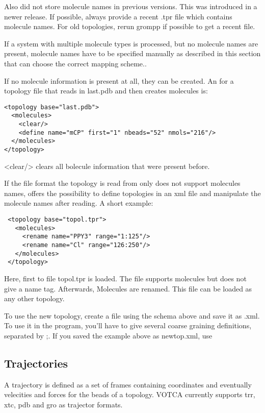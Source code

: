 Also \gromacs did not store molecule names in previous versions. This was introduced in a newer release. If possible, always provide a recent .tpr file which contains molecule names. For old topologies, rerun grompp if possible to get a recent file.

If a system with multiple molecule types is processed, but no molecule names are present, molecule names have to be specified manually as described in this section that \votca can choose the correct mapping scheme..

If no molecule information is present at all, they can be created. An for a topology file that reads in last.pdb and then creates molecules is:
\begin{lstlisting}
<topology base="last.pdb">
  <molecules>
    <clear/>
    <define name="mCP" first="1" nbeads="52" nmols="216"/>
  </molecules>
</topology>
\end{lstlisting}
<clear/> clears all bolecule information that were present before.

If the file format the topology is read from only does not support molecules names, \votca offers the possibility to define topologies in an xml file and manipulate the molecule names after reading. A short example:
\begin{lstlisting}
 <topology base="topol.tpr">
   <molecules>
     <rename name="PPY3" range="1:125"/>
     <rename name="Cl" range="126:250"/>
   </molecules>
 </topology>
\end{lstlisting}
Here, first to file topol.tpr is loaded. The file supports molecules but does not give a name tag. Afterwards, Molecules are renamed. This file can be loaded as any other topology.

To use the new topology, create a file using the schema above and save it as .xml. To use it in the program, you'll have to give several coarse graining definitions, separated by ;. If you saved the example above as newtop.xml, use 

\subsection{Trajectories}
A trajectory is defined as a set of frames containing coordinates and eventually velecities and forces for the beads of a topology.
VOTCA currently supports trr, xtc, pdb and gro as trajector formats.






